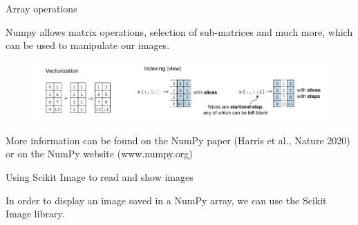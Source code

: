 \documentclass[9pt, aspectratio=169]{beamer}
\begin{document}
\begin{frame}
	{Array operations}

	Numpy allows matrix operations, selection of sub-matrices and much more, which can be used to manipulate our images.

	\begin{figure}
		\centering
		\includegraphics[width=\textwidth]{numpyoperations.png}
	\end{figure}


	More information can be found on the NumPy paper (Harris et al., Nature 2020) or on the NumPy website (www.numpy.org)
\end{frame}

\begin{frame}
	{Using Scikit Image to read and show images}

	In order to display an image saved in a NumPy array, we can use the Scikit Image library.

\end{frame}
\end{document}
